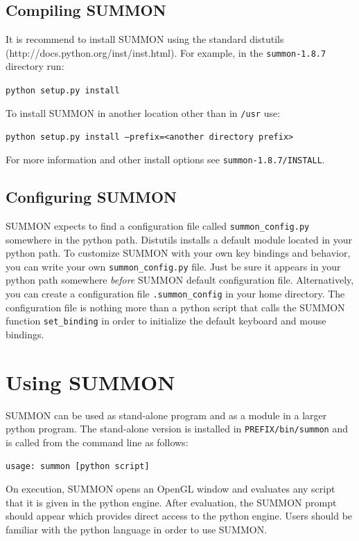 \documentclass[12pt]{article}
\newcommand{\code}[1]{{\tt #1}}
\newcommand{\codeblock}[1]{\vspace{.1in} {\tt #1} \vspace{.1in}}
\newcommand{\version}{1.8.7}
\begin{document}
\subsection{Compiling SUMMON}

It is recommend to install SUMMON using the standard distutils 
(http://docs.python.org/inst/inst.html).  For example, in the
\code{summon-\version} directory run:

\codeblock{python setup.py install}

To install SUMMON in another location other than in \code{/usr} use:

\codeblock{python setup.py install --prefix=<another directory prefix>}

For more information and other install options see 
\code{summon-\version/INSTALL}.


\subsection{Configuring SUMMON}

SUMMON expects to find a configuration file called  \code{summon\_config.py}
somewhere in the python path.  Distutils installs a default module located in
your python path.  To customize SUMMON with your own key bindings and behavior,
you can write your own \code{summon\_config.py} file.  Just be sure it appears
in your python path somewhere {\em before} SUMMON default configuration file. 
Alternatively, you can create a configuration file \code{.summon\_config} in
your home directory.  The configuration file is nothing more than a python
script that calls the SUMMON function  \code{set\_binding} in order to
initialize the default keyboard and mouse  bindings.



\section{Using SUMMON}
\label{sec:using}

SUMMON can be used as stand-alone program and as a module in a larger python
program.  The stand-alone version is installed in \code{PREFIX/bin/summon} and
is called from the command line as follows:

\codeblock{usage: summon [python script]}

On execution, SUMMON opens an OpenGL window and evaluates any script that it is
given in the python engine. After evaluation, the SUMMON prompt should appear
which provides direct access to the python engine.  Users should be familiar
with the python language in order to use SUMMON.
\end{document}
